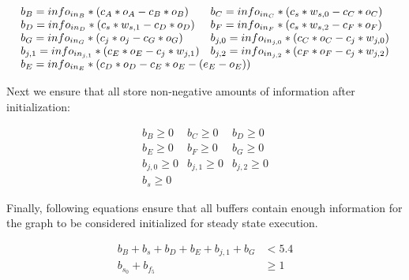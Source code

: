 \begin{displaymath}
\begin{array}{ll}
b_{B} = info_{in_B} * (c_{A} * o_A - c_{B} * o_B) &

b_{C} = info_{in_C} * (c_{s} * w_{s,0} - c_{C} * o_C) \\

b_{D} = info_{in_D} * (c_{s} * w_{s,1} - c_{D} * o_D) &

b_{F} = info_{in_F}* (c_{s} * w_{s,2} - c_{F} * o_F) \\

b_{G} = info_{in_G}* (c_{j} * o_j - c_{G} * o_G) &

b_{j, 0} = info_{in_{j,0}} * (c_C * o_C  - c_{j} * w_{j,0}) \\

b_{j, 1} = info_{in_{j,1}} * (c_E * o_E  - c_{j} * w_{j,1}) &

b_{j, 2} = info_{in_{j,2}} * (c_F * o_F  - c_{j} * w_{j,2}) \\

\multicolumn{2}{l}{b_{E} = info_{in_E}* (c_{D} * o_D - c_{E} * o_E - (e_E - o_E))} \\

\end{array}
\end{displaymath}

Next we ensure that all {\Channels} store non-negative amounts of
information after initialization:

\begin{displaymath}
\begin{array}{ccc}
b_{B} \ge 0 & b_{C} \ge 0 & b_{D} \ge 0 \\
b_{E} \ge 0 & b_{F} \ge 0 & b_{G} \ge 0 \\
b_{j,0} \ge 0 & b_{j,1} \ge 0 & b_{j,2} \ge 0 \\
b_{s} \ge 0
\end{array}
\end{displaymath}

Finally, following equations ensure that all buffers contain
enough information for the graph to be considered initialized for
steady state execution.

\begin{displaymath}
\begin{array}{rl}
b_{B} + b_{s} + b_{D} + b_{E} + b_{j, 1} + b_{G} & < 5.4 \\
b_{s_0} + b_{f_5} & \ge 1 \\
\end{array}
\end{displaymath}


